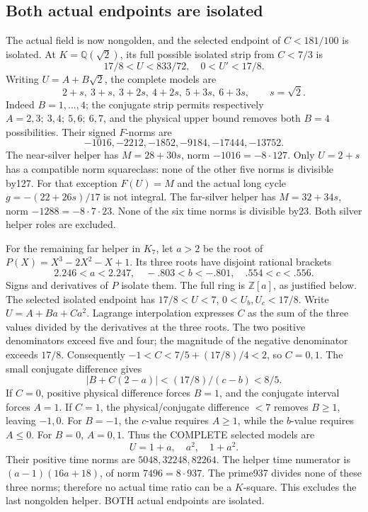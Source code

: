 \documentclass[11pt]{article}
\begin{document}
\subsection{Both actual endpoints are isolated}
\label{app:arithA16helpers}

The actual field is now nongolden, and the selected endpoint
of \(C<181/100\) is isolated.
At \(K=\mathbb Q(\sqrt2)\), its full possible isolated strip
from \(C<7/3\) is
\[
 17/8<U<833/72,\quad0<U'<17/8 .
\]
Writing \(U=A+B\sqrt2\), the complete models are
\[
 2+s,\ 3+s,\ 3+2s,\ 4+2s,\ 5+3s,\ 6+3s,\qquad s=\sqrt2 .
\]
Indeed \(B=1,\ldots,4\);
the conjugate strip permits respectively
\(A=2,3;\ 3,4;\ 5,6;\ 6,7\), and the physical upper
bound removes both \(B=4\) possibilities.
Their signed \(F\)-norms are
\[
                   -1016,-2212,-1852,-9184,-17444,-13752 .
\]
The near-silver helper has \(M=28+30s\), norm
\(-1016=-8\cdot127\).
Only \(U=2+s\) has a compatible norm squareclass:
none of the other five norms is divisible by127.
For that exception \(F(U)=M\) and the actual long cycle
\(g=-(22+26s)/17\) is not integral.
The far-silver helper has \(M=32+34s\), norm
\(-1288=-8\cdot7\cdot23\).
None of the six time norms is divisible by23.
Both silver helper roles are excluded.

For the remaining far helper in \(K_7\), let \(a>2\) be
the root of \(P(X)=X^3-2X^2-X+1\).
Its three roots have disjoint rational brackets
\[
 2.246<a<2.247,\quad -.803<b<-.801,\quad .554<c<.556 .
\]
Signs and derivatives of \(P\) isolate them.
The full ring is \(\mathbb Z[a]\), as justified below.
The selected isolated endpoint has
\(17/8<U<7\), \(0<U_b,U_c<17/8\).
Write \(U=A+Ba+Ca^2\).
Lagrange interpolation expresses \(C\) as the sum of the
three values divided by the derivatives at the three roots.
The two positive denominators exceed five and four;
the magnitude of the negative denominator exceeds \(17/8\).
Consequently \(-1<C<7/5+(17/8)/4<2\), so \(C=0,1\).
The small conjugate difference gives
\[
                 |B+C(2-a)|<(17/8)/(c-b)<8/5 .
\]
If \(C=0\), positive physical difference forces \(B=1\),
and the conjugate interval forces \(A=1\).
If \(C=1\), the physical/conjugate difference \(<7\)
removes \(B\ge1\), leaving \(-1,0\).
For \(B=-1\), the \(c\)-value requires \(A\ge1\), while
the \(b\)-value requires \(A\le0\).
For \(B=0\), \(A=0,1\).
Thus the COMPLETE selected models are
\[
                               U=1+a,\quad a^2,\quad1+a^2 .
\]
Their positive time norms are \(5048,32248,82264\).
The helper time numerator is
\((a-1)(16a+18)\), of norm \(7496=8\cdot937\).
The prime937 divides none of these three norms;
therefore no actual time ratio can be a \(K\)-square.
This excludes the last nongolden helper.
BOTH actual endpoints are isolated.
\end{document}
